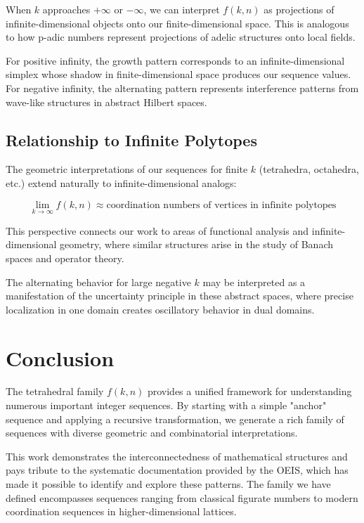 \documentclass[12pt,a4paper]{article}
\begin{document}
When $k$ approaches $+\infty$ or $-\infty$, we can interpret $f(k,n)$ as projections of infinite-dimensional objects onto our finite-dimensional space. This is analogous to how p-adic numbers represent projections of adelic structures onto local fields.

For positive infinity, the growth pattern corresponds to an infinite-dimensional simplex whose shadow in finite-dimensional space produces our sequence values. For negative infinity, the alternating pattern represents interference patterns from wave-like structures in abstract Hilbert spaces.

\subsection{Relationship to Infinite Polytopes}

The geometric interpretations of our sequences for finite $k$ (tetrahedra, octahedra, etc.) extend naturally to infinite-dimensional analogs:

\begin{equation}
\lim_{k \to \infty} f(k,n) \approx \text{coordination numbers of vertices in infinite polytopes}
\end{equation}

This perspective connects our work to areas of functional analysis and infinite-dimensional geometry, where similar structures arise in the study of Banach spaces and operator theory.

The alternating behavior for large negative $k$ may be interpreted as a manifestation of the uncertainty principle in these abstract spaces, where precise localization in one domain creates oscillatory behavior in dual domains.

\section{Conclusion}

The tetrahedral family $f(k,n)$ provides a unified framework for understanding numerous important integer sequences. By starting with a simple "anchor" sequence and applying a recursive transformation, we generate a rich family of sequences with diverse geometric and combinatorial interpretations.

This work demonstrates the interconnectedness of mathematical structures and pays tribute to the systematic documentation provided by the OEIS, which has made it possible to identify and explore these patterns. The family we have defined encompasses sequences ranging from classical figurate numbers to modern coordination sequences in higher-dimensional lattices.
\end{document}
